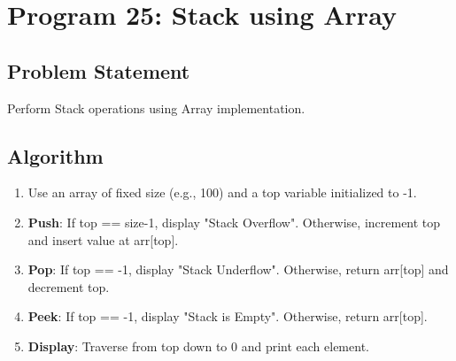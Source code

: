 \documentclass[a4paper,12pt]{article}
\begin{document}
\newpage

\section*{Program 25: Stack using Array}

\subsection*{Problem Statement}
Perform Stack operations using Array implementation.

\subsection*{Algorithm}
\begin{enumerate}
    \item Use an array of fixed size (e.g., 100) and a top variable initialized to -1.
    \item \textbf{Push}: If top == size-1, display "Stack Overflow". Otherwise, increment top and insert value at arr[top].
    \item \textbf{Pop}: If top == -1, display "Stack Underflow". Otherwise, return arr[top] and decrement top.
    \item \textbf{Peek}: If top == -1, display "Stack is Empty". Otherwise, return arr[top].
    \item \textbf{Display}: Traverse from top down to 0 and print each element.
\end{enumerate}
\end{document}
